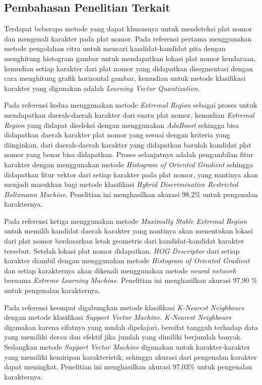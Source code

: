 \subsection{Pembahasan Penelitian Terkait}
\noindent Terdapat beberapa metode yang dapat khususnya untuk mendeteksi plat nomor dan mengenali karakter pada plat nomor.
\noindent Pada referensi pertama \cite{nugroho} menggunakan metode pengolahan citra untuk mencari kandidat-kandidat pita dengan menghitung histogram gambar untuk mendapatkan lokasi plat nomor kendaraan, kemudian setiap karakter dari plat nomor yang didapatkan disegmentasi dengan cara menghitung grafik horizontal gambar, kemudian untuk metode klasifikasi karakter yang digunakan adalah \textit{Learning Vector Quantization}.

\noindent Pada referensi kedua \cite{gou2016} menggunakan metode \textit{Extremal Region} sebagai proses untuk mendapatkan daerah-daerah karakter dari suatu plat nomor, kemudian \textit{Extremal Region} yang didapat diseleksi dengan menggunakan \textit{AdaBoost} sehingga bisa didapatkan daerah karakter plat nomor yang sesuai dengan kriteria yang diinginkan, dari daerah-daerah karakter yang didapatkan barulah kandidat plat nomor yang benar bisa didapatkan. Proses selanjutnya adalah pengambilan fitur karakter dengan menggunakan metode \textit{Histogram of Oriented Gradient} sehingga didapatkan fitur vektor dari setiap karakter pada plat nomor, yang nantinya akan menjadi masukkan bagi metode klasifikasi \textit{Hybrid Discriminative Restricted Boltzmann Machine}. Penelitian ini menghasilkan akurasi 98,2\% untuk pengenalan karakternya.

\noindent Pada referensi ketiga \cite{gou2014} menggunakan metode \textit{Maximally Stable Extremal Region} untuk memilih kandidat daerah karakter yang nantinya akan menentukan lokasi dari plat nomor berdasarkan letak geometris dari kandidat-kandidat karakter tersebut. Setelah lokasi plat nomor didapatkan, \textit{HOG Descriptor} dari setiap karakter diambil dengan menggunakan metode \textit{Histogram of Oriented Gradient} dan setiap karakternya akan dikenali menggunakan metode \textit{neural network} bernama \textit{Extreme Learning Machine}. Penelitian ini menghasilkan akurasi 97,90 \% untuk pengenalan karakternya.

\noindent Pada referensi keempat \cite{tabrizi} digabungkan metode klasifikasi \textit{K-Nearest Neighbours} dengan metode klasifikasi \textit{Support Vector Machine}. \textit{K-Nearest Neighbours} digunakan karena sifatnya yang mudah dipelajari, bersifat tangguh terhadap data yang memiliki derau dan efektif jika jumlah yang dimiliki berjumlah banyak. Sedangkan metode \textit{Support Vector Machine} digunakan untuk karakter-karakter yang memiliki kemiripan karakteristik, sehingga akurasi dari pengenalan karakter dapat meningkat. Penelitian ini menghasilkan akurasi 97,03\% untuk pengenalan karakternya.

